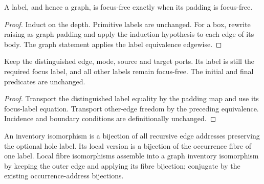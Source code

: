 




\begin{lemma}
A label, and hence a graph, is focus-free exactly when its padding is focus-free.
\end{lemma}

\begin{proof}
Induct on the depth. Primitive labels are unchanged. For a box, rewrite raising as graph padding and apply the induction hypothesis to each edge of its body. The graph statement applies the label equivalence edgewise.
\end{proof}




\begin{lemma}
Keep the distinguished edge, mode, source and target ports. Its label is still the required focus label, and all other labels remain focus-free. The initial and final predicates are unchanged.
\end{lemma}

\begin{proof}
Transport the distinguished label equality by the padding map and use its focus-label equation. Transport other-edge freedom by the preceding equivalence. Incidence and boundary conditions are definitionally unchanged.
\end{proof}






\begin{definition}
An inventory isomorphism is a bijection of all recursive edge addresses preserving the optional hole label. Its local version is a bijection of the occurrence fibre of one label. Local fibre isomorphisms assemble into a graph inventory isomorphism by keeping the outer edge and applying its fibre bijection; conjugate by the existing occurrence-address bijections.
\end{definition}

